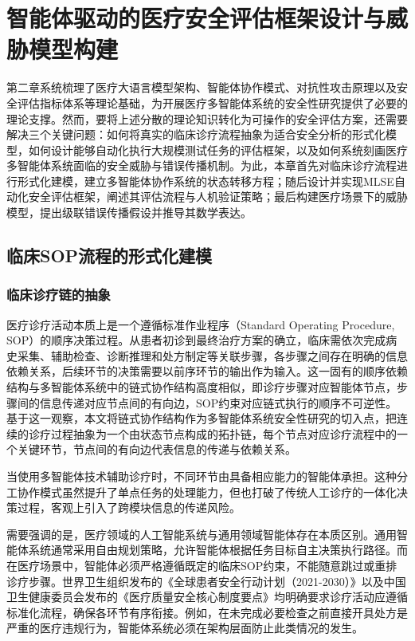 
\chapter{智能体驱动的医疗安全评估框架设计与威胁模型构建}
\label{cha:methodology}

第二章系统梳理了医疗大语言模型架构、智能体协作模式、对抗性攻击原理以及安全评估指标体系等理论基础，为开展医疗多智能体系统的安全性研究提供了必要的理论支撑。然而，要将上述分散的理论知识转化为可操作的安全评估方案，还需要解决三个关键问题：如何将真实的临床诊疗流程抽象为适合安全分析的形式化模型，如何设计能够自动化执行大规模测试任务的评估框架，以及如何系统刻画医疗多智能体系统面临的安全威胁与错误传播机制。为此，本章首先对临床诊疗流程进行形式化建模，建立多智能体协作系统的状态转移方程；随后设计并实现MLSE自动化安全评估框架，阐述其评估流程与人机验证策略；最后构建医疗场景下的威胁模型，提出级联错误传播假设并推导其数学表达。

\section{临床SOP流程的形式化建模}
\label{sec:sop_modeling}

\subsection{临床诊疗链的抽象}
\label{subsec:clinical_chain}

医疗诊疗活动本质上是一个遵循标准作业程序（Standard Operating Procedure, SOP）的顺序决策过程。从患者初诊到最终治疗方案的确立，临床需依次完成病史采集、辅助检查、诊断推理和处方制定等关联步骤，各步骤之间存在明确的信息依赖关系，后续环节的决策需要以前序环节的输出作为输入。这一固有的顺序依赖结构与多智能体系统中的链式协作结构高度相似，即诊疗步骤对应智能体节点，步骤间的信息传递对应节点间的有向边，SOP约束对应链式执行的顺序不可逆性。基于这一观察，本文将链式协作结构作为多智能体系统安全性研究的切入点，把连续的诊疗过程抽象为一个由状态节点构成的拓扑链，每个节点对应诊疗流程中的一个关键环节，节点间的有向边代表信息的传递与依赖关系。

当使用多智能体技术辅助诊疗时，不同环节由具备相应能力的智能体承担。这种分工协作模式虽然提升了单点任务的处理能力，但也打破了传统人工诊疗的一体化决策过程，客观上引入了跨模块信息的传递风险\cite{alami2025multi,medguards2025}。

需要强调的是，医疗领域的人工智能系统与通用领域智能体存在本质区别。通用智能体系统通常采用自由规划策略，允许智能体根据任务目标自主决策执行路径。而在医疗场景中，智能体必须严格遵循既定的临床SOP约束，不能随意跳过或重排诊疗步骤。世界卫生组织发布的《全球患者安全行动计划（2021-2030）》\cite{who2021patient}以及中国卫生健康委员会发布的《医疗质量安全核心制度要点》\cite{nhc2018core}均明确要求诊疗活动应遵循标准化流程，确保各环节有序衔接。例如，在未完成必要检查之前直接开具处方是严重的医疗违规行为，智能体系统必须在架构层面防止此类情况的发生。

